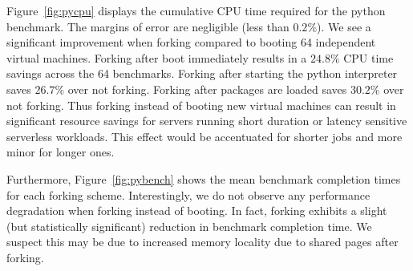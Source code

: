  Figure~\ref{fig:pycpu} displays the cumulative CPU
time required for the python benchmark. The margins of error are negligible
(less than $0.2$\%). We see a significant improvement when forking compared to
booting 64 independent virtual machines. Forking after boot immediately results
in a $24.8$\% CPU time savings across the 64 benchmarks. Forking after starting
the python interpreter saves $26.7$\% over not forking. Forking after packages
are loaded saves $30.2\%$ over not forking. Thus forking instead of booting new
virtual machines can result in significant resource savings for servers running
short duration or latency sensitive serverless workloads. This effect would be
accentuated for shorter jobs and more minor for longer ones.

Furthermore, Figure~\ref{fig:pybench} shows the mean benchmark completion times
for each forking scheme. Interestingly, we do not observe any performance
degradation when forking instead of booting. In fact, forking exhibits a slight
(but statistically significant) reduction in benchmark completion time. We
suspect this may be due to increased memory locality due to shared pages after
forking.
